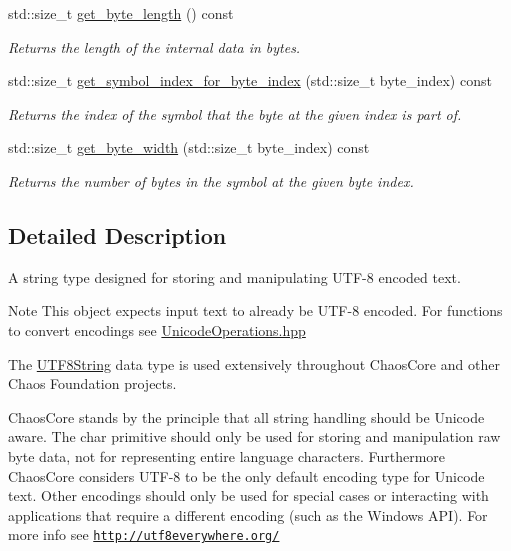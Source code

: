\begin{DoxyCompactItemize}
std\-::size\-\_\-t \hyperlink{classchaos_1_1uni_1_1_u_t_f8_string_a608a9a344875410a9b6e50d9ee0dbb65}{get\-\_\-byte\-\_\-length} () const 
\begin{DoxyCompactList}\small\item\em Returns the length of the internal data in bytes. \end{DoxyCompactList}\item 
std\-::size\-\_\-t \hyperlink{classchaos_1_1uni_1_1_u_t_f8_string_a89e9a1230821381e1d6d09099c119693}{get\-\_\-symbol\-\_\-index\-\_\-for\-\_\-byte\-\_\-index} (std\-::size\-\_\-t byte\-\_\-index) const 
\begin{DoxyCompactList}\small\item\em Returns the index of the symbol that the byte at the given index is part of. \end{DoxyCompactList}\item 
std\-::size\-\_\-t \hyperlink{classchaos_1_1uni_1_1_u_t_f8_string_ae0865f2a2dc39b4a9c3a7c968123f8fe}{get\-\_\-byte\-\_\-width} (std\-::size\-\_\-t byte\-\_\-index) const 
\begin{DoxyCompactList}\small\item\em Returns the number of bytes in the symbol at the given byte index. \end{DoxyCompactList}\end{DoxyCompactItemize}


\subsection{Detailed Description}
A string type designed for storing and manipulating U\-T\-F-\/8 encoded text. 

\begin{DoxyNote}{Note}
This object expects input text to already be U\-T\-F-\/8 encoded. For functions to convert encodings see \hyperlink{_unicode_operations_8hpp}{Unicode\-Operations.\-hpp}
\end{DoxyNote}
The \hyperlink{classchaos_1_1uni_1_1_u_t_f8_string}{U\-T\-F8\-String} data type is used extensively throughout Chaos\-Core and other Chaos Foundation projects.

Chaos\-Core stands by the principle that all string handling should be Unicode aware. The {\ttfamily char} primitive should only be used for storing and manipulation raw byte data, not for representing entire language characters. Furthermore Chaos\-Core considers U\-T\-F-\/8 to be the only default encoding type for Unicode text. Other encodings should only be used for special cases or interacting with applications that require a different encoding (such as the Windows A\-P\-I). For more info see \href{http://utf8everywhere.org/}{\tt http\-://utf8everywhere.\-org/}


